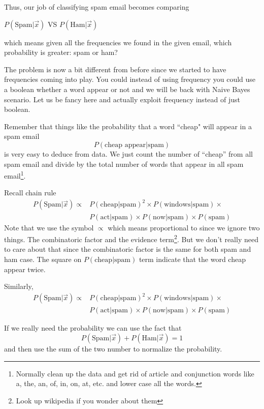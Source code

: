 \documentclass[a4paper, 12pt]{article}
\begin{document}
Thus, our job of classifying spam email becomes comparing
\begin{center}
	$P(\text{Spam}|\vec{x})$ VS $P(\text{Ham}|\vec{x})$
\end{center}
which means given all the frequencies we found in the given email, which probability is greater: spam or ham?

The problem is now a bit different from before since we started to have frequencies coming into play. You could instead of using frequency you could use a boolean whether a word appear or not and we will be back with Naive Bayes scenario. Let us be fancy here and actually exploit frequency instead of just boolean.

Remember that things like the probability that a word ``cheap" will appear in a spam email
\[
	P(\text{cheap appear} | \text{spam})
\]
is very easy to deduce from data. We just count the number of ``cheap'' from all spam email and divide by the total number of words that appear in all spam email\footnote{Normally clean up the data and get rid of article and conjunction words like a, the, an, of, in, on, at, etc. and lower case all the words.}.

Recall chain rule
\begin{align}
	P(\text{Spam} | \vec{x}) \propto& P(\text{cheap}|\text{spam})^2 \times P(\text{windows}|\text{spam})\times \nonumber\\
	&  P(\text{act}|\text{spam}) \times P(\text{now}|\text{spam}) \times P(\text{spam})
\end{align}
Note that we use the symbol $\propto$ which means proportional to since we ignore two things. The combinatoric factor and the evidence term\footnote{Look up wikipedia if you wonder about them}. But we don't really need to care about that since the combinatoric factor is the same for both spam and ham case. The square on $P(\text{cheap}|\text{spam})$ term indicate that the word cheap appear twice.

Similarly,
\begin{align}
P(\text{Spam} | \vec{x}) \propto& P(\text{cheap}|\text{spam})^2 \times P(\text{windows}|\text{spam})\times \nonumber\\
&  P(\text{act}|\text{spam}) \times P(\text{now}|\text{spam}) \times P(\text{spam})
\end{align}

If we really need the probability we can use the fact that
\[
	P(\text{Spam} | \vec{x}) + P(\text{Ham} | \vec{x}) = 1
\]
and then use the sum of the two number to normalize the probability.
\end{document}
